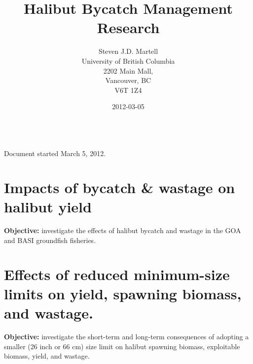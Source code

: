 \documentclass[]{article}
\title{Halibut Bycatch Management Research}
\author{ Steven J.D. Martell \\ University of British Columbia\\  2202 Main Mall, \\ Vancouver, BC\\ V6T 1Z4 }
\date{2012-03-05}
\begin{document}
\ifpdf
{}
\else
{}
\fi

\setcounter{page}{1}
    \maketitle \thispagestyle{empty}
    \vfill
    \noindent\hrulefill\\
	Document started March 5, 2012.
   \clearpage
\thispagestyle{empty}
\clearpage


\newpage





\newpage
\tableofcontents
{}
\newpage

\listoffigures
{}
\newpage

\listoftables
{}
\newpage

\part{Impacts of bycatch \& wastage on halibut yield}
\textbf{Objective:} investigate the effects of halibut bycatch and wastage in the GOA and BASI groundfish fisheries.


\part{Effects of reduced minimum-size limits on yield, spawning biomass, and wastage.}
\textbf{Objective:} investigate the short-term and long-term consequences of adopting a smaller (26 inch or 66 cm) size limit on halibut spawning biomass, exploitable biomass, yield, and wastage.





\clearpage
%




\appendix

\addtocounter{section}{0}
\renewcommand{\thetable}{A-\arabic{table}}
\setcounter{table}{0}

\end{document}
